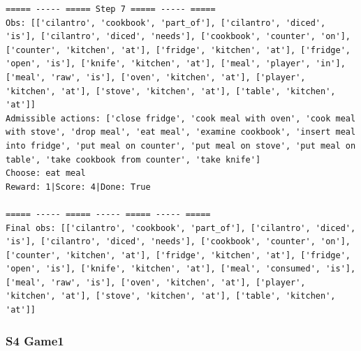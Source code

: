 \documentclass[11pt]{article}
\begin{document}
\begin{lstlisting}
===== ----- ===== Step 7 ===== ----- =====
Obs: [['cilantro', 'cookbook', 'part_of'], ['cilantro', 'diced', 'is'], ['cilantro', 'diced', 'needs'], ['cookbook', 'counter', 'on'], ['counter', 'kitchen', 'at'], ['fridge', 'kitchen', 'at'], ['fridge', 'open', 'is'], ['knife', 'kitchen', 'at'], ['meal', 'player', 'in'], ['meal', 'raw', 'is'], ['oven', 'kitchen', 'at'], ['player', 'kitchen', 'at'], ['stove', 'kitchen', 'at'], ['table', 'kitchen', 'at']]
Admissible actions: ['close fridge', 'cook meal with oven', 'cook meal with stove', 'drop meal', 'eat meal', 'examine cookbook', 'insert meal into fridge', 'put meal on counter', 'put meal on stove', 'put meal on table', 'take cookbook from counter', 'take knife']
Choose: eat meal
Reward: 1|Score: 4|Done: True

===== ----- ===== ----- ===== ----- =====
Final obs: [['cilantro', 'cookbook', 'part_of'], ['cilantro', 'diced', 'is'], ['cilantro', 'diced', 'needs'], ['cookbook', 'counter', 'on'], ['counter', 'kitchen', 'at'], ['fridge', 'kitchen', 'at'], ['fridge', 'open', 'is'], ['knife', 'kitchen', 'at'], ['meal', 'consumed', 'is'], ['meal', 'raw', 'is'], ['oven', 'kitchen', 'at'], ['player', 'kitchen', 'at'], ['stove', 'kitchen', 'at'], ['table', 'kitchen', 'at']]

\end{lstlisting}


\subsubsection{S4 Game1}
\end{document}
